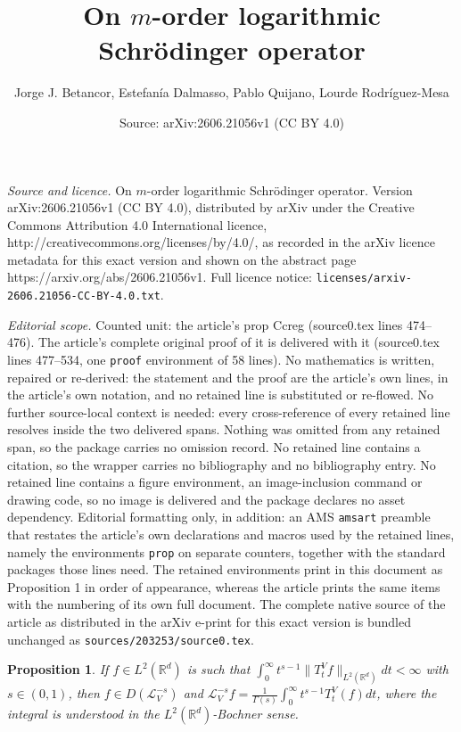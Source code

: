 \documentclass[10pt,a4paper]{amsart}
\title{On $m$-order logarithmic Schr\"odinger operator}
\author{Jorge J. Betancor, Estefan\'ia Dalmasso, Pablo Quijano, Lourde Rodr\'iguez-Mesa}
\date{Source: arXiv:2606.21056v1 (CC BY 4.0)}
\newtheorem{prop}{Proposition}
\begin{document}
\maketitle

\noindent\emph{Source and licence.} On $m$-order logarithmic Schr\"odinger operator. Version arXiv:2606.21056v1 (CC BY 4.0), distributed by arXiv under the Creative Commons Attribution 4.0 International licence, http://creativecommons.org/licenses/by/4.0/, as recorded in the arXiv licence metadata for this exact version and shown on the abstract page https://arxiv.org/abs/2606.21056v1. Full licence notice: \texttt{licenses/arxiv-2606.21056-CC-BY-4.0.txt}.\par\smallskip

\noindent\textit{Editorial scope.} Counted unit: the article's prop Ccreg (source0.tex lines 474--476). The article's complete original proof of it is delivered with it (source0.tex lines 477--534, one \texttt{proof} environment of 58 lines). No mathematics is written, repaired or re-derived: the statement and the proof are the article's own lines, in the article's own notation, and no retained line is substituted or re-flowed.  No further source-local context is needed: every cross-reference of every retained line resolves inside the two delivered spans.  Nothing was omitted from any retained span, so the package carries no omission record.  No retained line contains a citation, so the wrapper carries no bibliography and no bibliography entry.  No retained line contains a figure environment, an image-inclusion command or drawing code, so no image is delivered and the package declares no asset dependency.  Editorial formatting only, in addition: an AMS \texttt{amsart} preamble that restates the article's own declarations and macros used by the retained lines, namely the environments \texttt{prop} on separate counters, together with the standard packages those lines need.  The retained environments print in this document as Proposition 1 in order of appearance, whereas the article prints the same items with the numbering of its own full document.  The complete native source of the article as distributed in the arXiv e-print for this exact version is bundled unchanged as \texttt{sources/203253/source0.tex}.
\begin{prop}\label{Ccreg} If $f\in L^2(\mathbb{R}^d)$ is  such that $\int_0^\infty t^{s-1}\|T_t^Vf\|_{L^2(\mathbb{R}^d)}dt<\infty$ with $s\in (0,1)$, then $f\in D(\mathcal{L}_V^{-s})$ and 
$\mathcal{L}_V^{-s}f=\frac{1}{\Gamma(s)}\int_0^\infty t^{s-1}T_t^V(f)dt$, where the integral is understood in the $L^2(\mathbb{R}^d)$-Bochner sense.
\end{prop}
\end{document}
